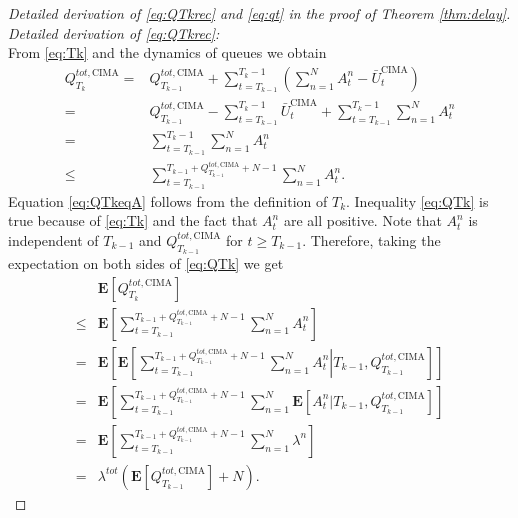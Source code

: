 \documentclass[onecolumn,draftcls]{IEEEtran}
\newcommand{\g}{\text{CIMA}}
\begin{document}
\section{}
\label{app:thm:delay}
\begin{proof}[Detailed derivation of \eqref{eq:QTkrec} and \eqref{eq:qt}  in the proof of Theorem \ref{thm:delay}]
\\
\textit{Detailed derivation of \eqref{eq:QTkrec}:}
\\
From \eqref{eq:Tk} and the dynamics of queues we obtain
\begin{align}
Q^{tot,\g}_{T_k} = & Q^{tot,\g}_{T_{k-1}} + \sum_{t=T_{k-1}}^{T_k-1}\left(\sum_{n=1}^N A^n_t - \bar{U}^\g_t\right) \nonumber\\
 = & Q^{tot,\g}_{T_{k-1}} - \sum_{t=T_{k-1}}^{T_k-1} \bar{U}^\g_t+ \sum_{t=T_{k-1}}^{T_k-1}\sum_{n=1}^N A^n_t \nonumber\\
 = &  \sum_{t=T_{k-1}}^{T_k-1}\sum_{n=1}^N A^n_t 
 \label{eq:QTkeqA}\\
 \leq &  \sum_{t=T_{k-1}}^{T_{k-1}+Q^{tot,\g}_{T_{k-1}}+N-1}\sum_{n=1}^N A^n_t .
 \label{eq:QTk}
\end{align}
Equation \eqref{eq:QTkeqA} follows from the definition of $T_k$. 
Inequality \eqref{eq:QTk} is true because of \eqref{eq:Tk} and the fact that $A^n_t$ are all positive.
Note that $A^n_t$ is independent of $T_{k-1}$ and $Q^{tot,\g}_{T_{k-1}}$ for $t\geq T_{k-1}$. 
Therefore, taking the expectation on both sides of \eqref{eq:QTk} we get
\begin{align}
 &\mathbf{E}\left[Q^{tot,\g}_{T_k}\right] \nonumber\\
\leq & \mathbf{E}\left[\sum_{t=T_{k-1}}^{T_{k-1}+Q^{tot,\g}_{T_{k-1}}+N-1}\sum_{n=1}^N A^n_t \right] \nonumber\\
= & \mathbf{E}\left[
\mathbf{E}\left[\left.\sum_{t=T_{k-1}}^{T_{k-1}+Q^{tot,\g}_{T_{k-1}}+N-1}\sum_{n=1}^N A^n_t
\right|T_{k-1},Q^{tot,\g}_{T_{k-1}}\right] 
\right] \nonumber\\
= & \mathbf{E}\left[
\sum_{t=T_{k-1}}^{T_{k-1}+Q^{tot,\g}_{T_{k-1}}+N-1}\sum_{n=1}^N 
\mathbf{E}\left[A^n_t | T_{k-1},Q^{tot,\g}_{T_{k-1}}\right] 
\right] \nonumber\\
= & \mathbf{E}\left[
\sum_{t=T_{k-1}}^{T_{k-1}+Q^{tot,\g}_{T_{k-1}}+N-1}\sum_{n=1}^N \lambda^n\right] \nonumber\\
= & \lambda^{tot}\left(\mathbf{E}\left[Q^{tot,\g}_{T_{k-1}}\right]+N\right).
\end{align}


\end{proof}
\end{document}
